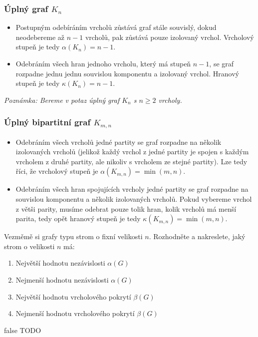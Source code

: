 \documentclass[10pt, a4paper]{ReportSheet}
\begin{document}
\begin{uloha}{8}{2}
        \subsubsection{Úplný graf $K_n$}
        \begin{itemize}
            \item Postupným odebíráním vrcholů zůstává graf stále souvislý, dokud neodebereme až $n-1$ vrcholů, pak zůstává pouze izolovaný vrchol. Vrcholový stupeň je tedy $\alpha(K_n) = n-1$.
            \item Odebráním všech hran jednoho vrcholu, který má stupeň $n-1$, se graf rozpadne jednu jednu souvislou
            komponentu a izolovaný vrchol. Hranový stupeň je tedy $\kappa(K_n) = n-1$.
        \end{itemize}
        \textit{Poznámka: Bereme v potaz úplný graf $K_n$ s $n \geq 2$ vrcholy.}

        \subsubsection{Úplný bipartitní graf $K_{m,n}$}
        \begin{itemize}
            \item Odebráním všech vrcholů jedné partity se graf rozpadne na několik izolovaných vrcholů (jelikož každý
            vrchol z jedné partity je spojen s každým vrcholem z druhé partity, ale nikoliv s vrcholem ze stejné partity). Lze tedy říci, že vrcholový stupeň je $\alpha(K_{m,n}) = \min(m, n)$.
            \item Odebráním všech hran spojujících vrcholy jedné partity se graf rozpadne na souvislou komponentu a
            několik izolovaných vrcholů. Pokud vybereme vrchol z větši parity, musíme odebrat pouze tolik hran, kolik
            vrcholů má menší parita, tedy opět hranový stupeň je tedy $\kappa(K_{m,
            n}) = \min(m, n)$.
        \end{itemize}

    \end{uloha}

    \begin{uloha}{9}{2}{
        Vezměmě si grafy typu strom o fixní velikosti $n$. Rozhodněte a nakreslete, jaký strom o velikosti $n$ má:
        \begin{enumerate}
            \renewcommand{\theenumi}{\alph{enumi}}
            \item Největší hodnotu nezávislosti $\alpha(G)$
            \item Nejmenší hodnotu nezávislosti $\alpha(G)$
            \item Největší hodnotu vrcholového pokrytí $\beta(G)$
            \item Nejmenší hodnotu vrcholového pokrytí $\beta(G)$
        \end{enumerate}
    }{false}
        TODO
    \end{uloha}
\end{document}
